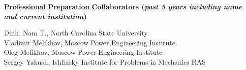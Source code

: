 \documentclass[11pt,letterpaper,english]{article}
\begin{document}
\begin{flushleft} {\bf Professional Preparation}
\vspace{-6pt}
{\bf Collaborators ({\emph{past 5 years including name and current institution}})} 
{\parindent 16pt

Dinh, Nam T., North Carolina State University \\
Vladimir Melikhov, Moscow Power Engineering Institute  \\
Oleg Melikhov, Moscow Power Engineering Institute \\
Sergey Yakush, Ishlinsky Institute for Problems in Mechanics RAS \\
}


\end{flushleft}
\end{document}
